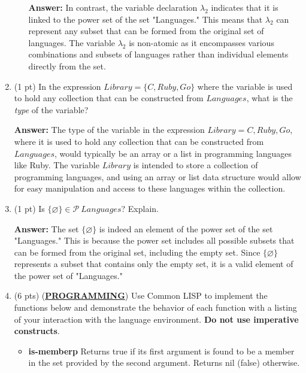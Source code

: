 \documentclass[12pt]{article}
\begin{document}
\begin{spacing}{1.5}
\begin{enumerate}
\begin{enumerate}
		      	      \textbf{Answer:} In contrast, the variable declaration $\lambda_2$ indicates that it is linked to the power set of the set "Languages." This means that $\lambda_2$ can represent any subset that can be formed from the original set of languages. The variable $\lambda_2$ is non-atomic as it encompasses various combinations and subsets of languages rather than individual elements directly from the set.\\
		      	      		      	      		      	                  
		      \end{enumerate}
		      		      		      
		\item (1 pt) In the expression $Library = \{C, Ruby, Go\}$ where the variable is used to hold any collection that can be constructed from $Languages$, what is the \textit{type} of the variable?
		      		      		      
		      \textbf{Answer:} The type of the variable in the expression $Library = {C, Ruby, Go}$, where it is used to hold any collection that can be constructed from $Languages$, would typically be an array or a list in programming languages like Ruby. The variable $Library$ is intended to store a collection of programming languages, and using an array or list data structure would allow for easy manipulation and access to these languages within the collection.\\
		      		      		                  
		\item (1 pt) Is $\{\varnothing\} \in \mathcal{P} \: Languages$? Explain.
		      		      		      
		      \textbf{Answer:} The set $\{\varnothing\}$ is indeed an element of the power set of the set "Languages." This is because the power set includes all possible subsets that can be formed from the original set, including the empty set. Since $\{\varnothing\}$ represents a subset that contains only the empty set, it is a valid element of the power set of "Languages."\\
		      		      		                  
		\item (6 pts) (\textbf{\uline{{PROGRAMMING}}}) Use Common LISP to implement the functions below and demonstrate the behavior of each function with a listing of your interaction with the language environment. \textbf{Do not use imperative constructs}.
		      		      		      
		      \begin{itemize}
		      	\item \textbf{is-memberp} Returns true if its first argument is found to be a member in the set provided by the second argument. Returns nil (false) otherwise.
		      	      		      	      		      	      

\end{itemize}
\end{enumerate}
\end{spacing}
\end{document}
